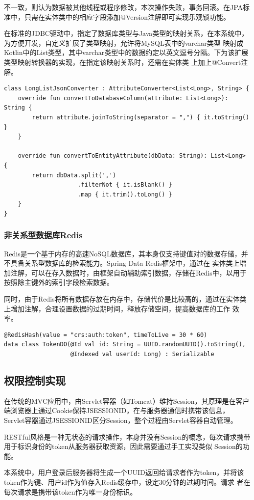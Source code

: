 \documentclass[titlepage,UTF8,linespread=1.5]{ctexart}
\begin{document}
不一致，则认为数据被其他线程或程序修改，本次操作失败，事务回滚。在JPA标准中，只需在实体类中的相应字段添加@Version注解即可实现乐观锁功能。\par
在标准的JDBC驱动中，指定了数据库类型与Java类型的映射关系，在本系统中，为方便开发，自定义扩展了类型映射，允许将MySQL表中的varchar类型
映射成Kotlin中的List类型，其中varchar类型中的数据约定以英文逗号分隔。下为该扩展类型映射转换器的实现，在指定该映射关系时，还需在实体类
上加上@Convert注解。\par
\begin{mdframed}\begin{verbatim}
class LongListJsonConverter : AttributeConverter<List<Long>, String> {
    override fun convertToDatabaseColumn(attribute: List<Long>): String {
        return attribute.joinToString(separator = ",") { it.toString() }
    }

    override fun convertToEntityAttribute(dbData: String): List<Long> {
        return dbData.split(',')
                     .filterNot { it.isBlank() }
                     .map { it.trim().toLong() }
    }
}
\end{verbatim}\end{mdframed}\par

\subsubsection{非关系型数据库Redis}
Redis是一个基于内存的高速NoSQL数据库，其本身仅支持键值对的数据存储，并不具备关系型数据库的检索能力。Spring Data Redis框架中，通过在
实体类上增加注解，可以在存入数据时，由框架自动辅助索引数据，存储在Redis中，以用于按照除主键外的索引字段检索数据。\par
同时，由于Redis将所有数据存放在内存中，存储代价是比较高的，通过在实体类上增加注解，合理设置数据的过期时间，释放存储空间，提高数据库的工作
效率。\par
\begin{mdframed}\begin{verbatim}
@RedisHash(value = "crs:auth:token", timeToLive = 30 * 60)
data class TokenDO(@Id val id: String = UUID.randomUUID().toString(),
                   @Indexed val userId: Long) : Serializable
\end{verbatim}\end{mdframed}\par

\subsection{权限控制实现}
在传统的MVC应用中，由Servlet容器（如Tomcat）维持Session，其原理是在客户端浏览器上通过Cookie保持JSESSIONID，在与服务器通信时携带该信息，
Servlet容器通过JSESSIONID区分Session，整个过程由Servlet容器自动管理。\cite{tomcat}\par
RESTful风格是一种无状态的请求操作，本身并没有Session的概念，每次请求携带用于标识身份的token从服务器获取资源，因此需要通过手工实现类似
Session的功能。\par
本系统中，用户登录后服务器将生成一个UUID\cite{uuid}返回给请求者作为token，并将该token作为键、用户id作为值存入Redis缓存中，设定30分钟的过期时间。请求
者在每次请求是携带该token作为唯一身份标识。\par
\end{document}
